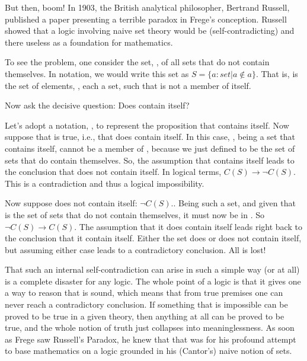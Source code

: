 \documentclass[letterpaper,10pt,english]{sphinxmanual}
\begin{document}
But then, boom! In 1903, the British analytical philosopher, Bertrand
Russell, published a paper presenting a terrible paradox in Frege’s
conception. Russell showed that a logic involving naive set theory
would be  (self-contradicting) and there useless as a
foundation for mathematics.

To see the problem, one consider the set, , of all sets that do not
contain themselves. In  notation, we would write
this set as \(S = \{ a: set | a \notin a \}.\) That is,  is the
set of elements, , each a set, such that  is not a member of
itself.

Now ask the decisive question: Does  contain itself?

Let’s adopt a notation, , to represent the proposition that 
contains itself. Now suppose that  is true, i.e., that  does
contain itself. In this case, , being a set that contains itself,
cannot be a member of , because we just defined  to be the set
of sets that do  contain themselves. So, the assumption that 
contains itself leads to the conclusion that  does not contain
itself. In logical terms, \(C(S) \rightarrow \neg C(S).\) This is
a contradiction and thus a logical impossibility.

Now suppose  does not contain itself: \(\neg C(S).\). Being
such a set, and given that  is the set of sets that do not contain
themselves, it must now be in . So \(\neg C(S) \rightarrow
C(S).\) The assumption that it does  contain itself leads right
back to the conclusion that it  contain itself. Either the set
does or does not contain itself, but assuming either case leads to a
contradictory conclusion. All is lost!

That such an internal self-contradiction can arise in such a simple
way (or at all) is a complete disaster for any logic. The whole point
of a logic is that it gives one a way to reason that is sound, which
means that from true premises one can never reach a contradictory
conclusion. If something that is impossible can be proved to be true
in a given theory, then anything at all can be proved to be true, and
the whole notion of truth just collapses into meaninglessness. As soon
as Frege saw Russell’s Paradox, he knew that that was  for
his profound attempt to base mathematics on a logic grounded in his
(Cantor’s) naive notion of sets.
\end{document}
